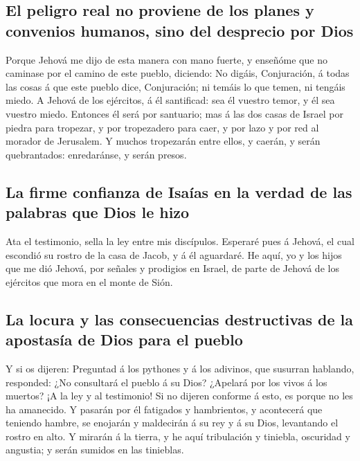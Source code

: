 \hypertarget{el-peligro-real-no-proviene-de-los-planes-y-convenios-humanos-sino-del-desprecio-por-dios}{%
\subsection{El peligro real no proviene de los planes y convenios
humanos, sino del desprecio por
Dios}\label{el-peligro-real-no-proviene-de-los-planes-y-convenios-humanos-sino-del-desprecio-por-dios}}

 Porque Jehová me dijo de esta manera con mano fuerte, y
enseñóme que no caminase por el camino de este pueblo, diciendo:
 No digáis, Conjuración, á todas las cosas á que este
pueblo dice, Conjuración; ni temáis lo que temen, ni tengáis miedo.
 A Jehová de los ejércitos, á él santificad: sea él vuestro
temor, y él sea vuestro miedo.  Entonces él será por
santuario; mas á las dos casas de Israel por piedra para tropezar, y por
tropezadero para caer, y por lazo y por red al morador de Jerusalem.
 Y muchos tropezarán entre ellos, y caerán, y serán
quebrantados: enredaránse, y serán presos.

\hypertarget{la-firme-confianza-de-isauxedas-en-la-verdad-de-las-palabras-que-dios-le-hizo}{%
\subsection{La firme confianza de Isaías en la verdad de las palabras
que Dios le
hizo}\label{la-firme-confianza-de-isauxedas-en-la-verdad-de-las-palabras-que-dios-le-hizo}}

 Ata el testimonio, sella la ley entre mis discípulos.
 Esperaré pues á Jehová, el cual escondió su rostro de la
casa de Jacob, y á él aguardaré.  He aquí, yo y los hijos
que me dió Jehová, por señales y prodigios en Israel, de parte de Jehová
de los ejércitos que mora en el monte de Sión.

\hypertarget{la-locura-y-las-consecuencias-destructivas-de-la-apostasuxeda-de-dios-para-el-pueblo}{%
\subsection{La locura y las consecuencias destructivas de la apostasía
de Dios para el
pueblo}\label{la-locura-y-las-consecuencias-destructivas-de-la-apostasuxeda-de-dios-para-el-pueblo}}

 Y si os dijeren: Preguntad á los pythones y á los
adivinos, que susurran hablando, responded: ¿No consultará el pueblo á
su Dios? ¿Apelará por los vivos á los muertos?  ¡A la ley y
al testimonio! Si no dijeren conforme á esto, es porque no les ha
amanecido.  Y pasarán por él fatigados y hambrientos, y
acontecerá que teniendo hambre, se enojarán y maldecirán á su rey y á su
Dios, levantando el rostro en alto.  Y mirarán á la tierra,
y he aquí tribulación y tiniebla, oscuridad y angustia; y serán sumidos
en las tinieblas.

